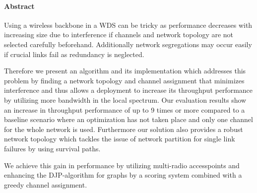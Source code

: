 \cleardoublepage

\vspace {2cm}
\begin{center}
\paragraph{Abstract}
\hrulefill
\end{center}
Using a wireless backbone in a \ac{WDS} can be tricky as performance decreases with increasing size due to interference if 
channels and network topology are not selected carefully beforehand. Additionally network segregations may occur easily if 
crucial links fail as redundancy is neglected.

Therefore we present an algorithm and its implementation which addresses this problem by finding a network topology and channel assignment 
that minimizes interference and thus allows a deployment to increase its throughput performance by utilizing more bandwidth in the local spectrum. 
Our evaluation results show an increase in throughput performance of up to 9 times or more compared to a baseline scenario where an optimization has not taken place
and only one channel for the whole network is used.
Furthermore our solution also provides a robust network topology which tackles the issue of network partition for single link failures by using survival paths.

We achieve this gain in performance by utilizing multi-radio accesspoints and enhancing the \ac{DJP}-algorithm for graphs by a scoring system combined with
a greedy channel assignment.

